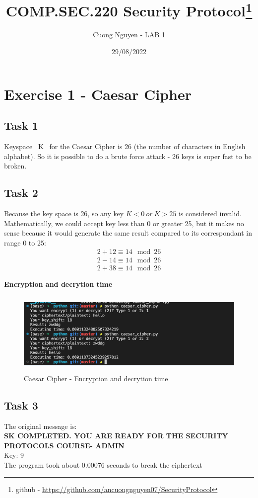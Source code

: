 \documentclass{article}
\title{COMP.SEC.220 Security Protocol\footnote{github - \url{https://github.com/ancuongnguyen07/SecurityProtocol}}}
\author{Cuong Nguyen - LAB 1}
\date{29/08/2022}
\begin{document}
    
\maketitle

\section*{Exercise 1 - Caesar Cipher}
%
\subsection*{Task 1}
%
Keyspace \textbar\ K \textbar\ for the Caesar Cipher is 26 (the number
of characters in English alphabet). So it is possible to do a brute
force attack - 26 keys is super fast to be broken.

\subsection*{Task 2}
%
Because the key space is 26, so any key \(K<0 \ or \ K>25\) is considered
invalid. Mathematically, we could accept key less than 0 or greater 25, but
it makes no sense because it would generate the same result compared to
its correspondant in range 0 to 25:
\begin{align*}
    2 + 12 \equiv 14 \mod 26\\
    2 - 14 \equiv 14 \mod 26\\
    2 + 38 \equiv 14 \mod 26
\end{align*}


\textbf{Encryption and decrytion time}
\begin{figure}[htp]
    \centering
    \includegraphics[width=120mm, height=40mm]{caesar_cipher_time.png}
    \caption{Caesar Cipher - Encryption and decrytion time}
    \label{fig:en_de_time}
\end{figure}

\subsection*{Task 3}
The original message is:\\
\textbf{SK COMPLETED. YOU ARE READY FOR THE SECURITY 
PROTOCOLS COURSE- ADMIN}\\ 
Key: 9\\
The program took about \(0.00076\) seconds to break the ciphertext
\end{document}
